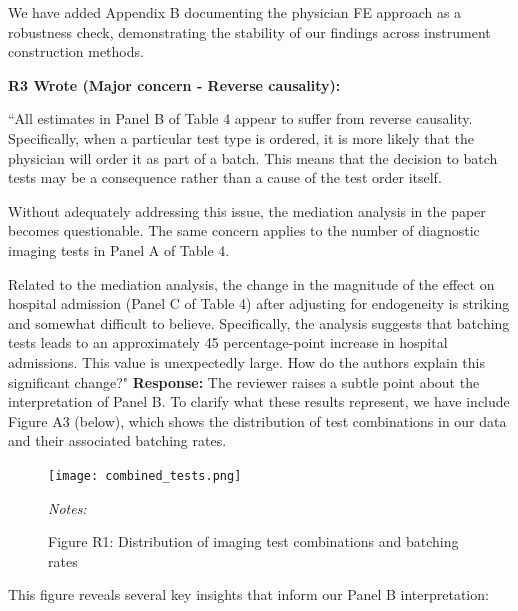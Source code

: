 \documentclass[11pt]{article}
\newenvironment{quote2}
{ \bigskip
\noindent
         \small\em
         \baselineskip=14pt
}
\newcommand{\1}{\hbox{\rm 1\kern-.35em 1}}
\begin{document}
{We have added Appendix B documenting the physician FE approach as a robustness check, demonstrating the stability of our findings across instrument construction methods.
\color{black}

\color{black}

\begin{quote2}
\textbf{R3 Wrote (Major concern -  Reverse causality):}  

\noindent ``All estimates in Panel B of Table 4 appear to suffer from reverse causality. Specifically, when a particular test type is ordered, it is more likely that the physician will order it as part of a batch. This means that the decision to batch tests may be a consequence rather than a cause of the test order itself.

Without adequately addressing this issue, the mediation analysis in the paper becomes questionable. The same concern applies to the number of diagnostic imaging tests in Panel A of Table 4.

Related to the mediation analysis, the change in the magnitude of the effect on hospital admission (Panel C of Table 4) after adjusting for endogeneity is striking and somewhat difficult to believe. Specifically, the analysis suggests that batching tests leads to an approximately 45 percentage-point increase in hospital admissions. This value is unexpectedly large. How do the authors explain this significant change?"
\end{quote2}

\noindent\textbf{Response:} \color{blue}
The reviewer raises a subtle point about the interpretation of Panel B. To clarify what these results represent, we have include Figure A3 (below), which shows the distribution of test combinations in our data and their associated batching rates.

\begin{figure}[ht]
\centering
\begin{threeparttable}
\caption*{Figure R1: Distribution of imaging test combinations and batching rates}
\texttt{[image: combined\_tests.png]}
    \label{fig:consort}
    \begin{tablenotes}
        \small
        \item \textit{Notes:} 
    \end{tablenotes}
\end{threeparttable}
\end{figure}


This figure reveals several key insights that inform our Panel B interpretation:

}
\end{document}
